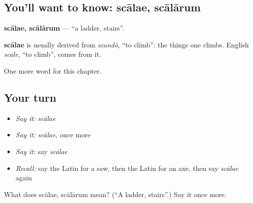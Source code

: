 \subsection*{You'll want to know: scālae, scālārum}
\textbf{scālae, scālārum} — \textquotedblleft{}a ladder, stairs\textquotedblright{}.

\begin{cousinweb}
\textbf{scālae} is usually derived from \emph{scandō}, \textquotedblleft{}to climb\textquotedblright{}: the things one climbs. English \emph{scale}, \textquotedblleft{}to climb\textquotedblright{}, comes from it.
\end{cousinweb}

\begin{grammarlens}[title={What you've built}]
One more word for this chapter.
\end{grammarlens}

\subsection*{Your turn}
\begin{itemize}
\raggedright
  \item \emph{Say it:} \emph{scālae}
  \item \emph{Say it:} \emph{scālae}, once more
  \item \emph{Say it:} say \emph{scālae}
  \item \emph{Recall:} say the Latin for a saw, then the Latin for an axe, then say \emph{scālae} again
\end{itemize}

\begin{tcolorbox}[breakable,colback=teal!4,colframe=teal!35!black,title={Before you move on}]
What does scālae, scālārum mean? (\textquotedblleft{}A ladder, stairs\textquotedblright{}.) Say it once more.
\end{tcolorbox}
